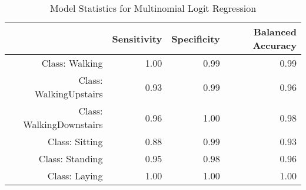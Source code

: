 \begin{table}[ht]
\centering
\caption{Model Statistics for Multinomial Logit Regression} 
\label{tab:conmat_stats_dmr}
\begin{tabular}{rrrr}
  \hline
 & Sensitivity & Specificity & Balanced Accuracy \\ 
  \hline
Class: Walking & 1.00 & 0.99 & 0.99 \\ 
  Class: WalkingUpstairs & 0.93 & 0.99 & 0.96 \\ 
  Class: WalkingDownstairs & 0.96 & 1.00 & 0.98 \\ 
  Class: Sitting & 0.88 & 0.99 & 0.93 \\ 
  Class: Standing & 0.95 & 0.98 & 0.96 \\ 
  Class: Laying & 1.00 & 1.00 & 1.00 \\ 
   \hline
\end{tabular}
\end{table}
